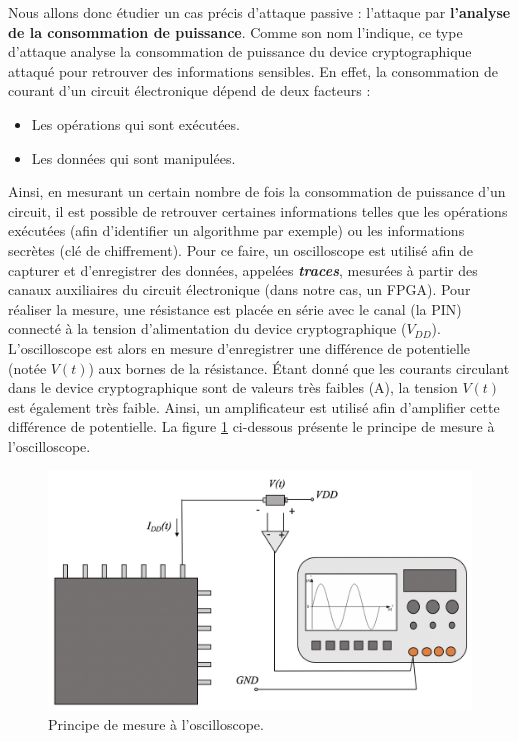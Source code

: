 \documentclass[10pt, oneside, a4paper]{article}
\begin{document}
Nous allons donc étudier un cas précis d'attaque passive : l'attaque par \textbf{l'analyse de la consommation de puissance}. Comme son nom l'indique, ce type d'attaque analyse la consommation de puissance du device cryptographique attaqué pour retrouver des informations sensibles. En effet, la consommation de courant d'un circuit électronique dépend de deux facteurs : 
\begin{itemize}
\item Les opérations qui sont exécutées.
\item Les données qui sont manipulées.
\end{itemize}
Ainsi, en mesurant un certain nombre de fois la consommation de puissance d'un circuit, il est possible de retrouver certaines informations telles que les opérations exécutées (afin d'identifier un algorithme par exemple) ou les informations secrètes (clé de chiffrement). Pour ce faire, un oscilloscope est utilisé afin de capturer et d'enregistrer des données, appelées \textbf{\textit{traces}}, mesurées à partir des canaux auxiliaires du circuit électronique (dans notre cas, un FPGA). Pour réaliser la mesure, une résistance est placée en série avec le canal (la PIN) connecté à la tension d'alimentation du device cryptographique ($V_{DD}$). L'oscilloscope est alors en mesure d'enregistrer une différence de potentielle (notée $V(t)$) aux bornes de la résistance. Étant donné que les courants circulant dans le device cryptographique sont de valeurs très faibles (\si{\micro}A), la tension $V(t)$ est également très faible. Ainsi, un amplificateur est utilisé afin d'amplifier cette différence de potentielle. La figure \ref{fig:oscillo} ci-dessous présente le principe de mesure à l'oscilloscope.
\begin{figure}[htbp]
    \centering
    \includegraphics[scale=0.4]{image/oscillo}
    \caption{Principe de mesure à l'oscilloscope.}
    \label{fig:oscillo} 
\end{figure}
\end{document}
